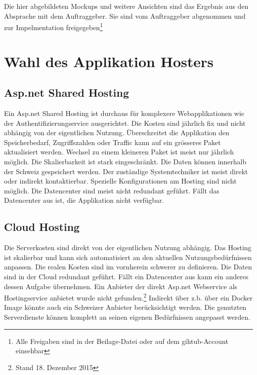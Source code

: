 Die hier abgebildeten Mockups und weitere Ansichten sind das Ergebnis
aus den Absprache mit dem Auftraggeber. Sie sind vom Auftraggeber
abgenommen und zur Impelmentation freigegeben\footnote{Alle Freigaben
  sind in der Beilage-Datei oder auf dem gihtub-Account einsehbar
  \newpage}

\section{Wahl des Applikation
Hosters}\label{wahl-des-applikation-hosters}

\subsection{Asp.net Shared Hosting}\label{asp.net-shared-hosting}

Ein Asp.net Shared Hosting ist durchaus für komplexere Webapplikationen
wie der Authentifizierungservice ausgerichtet. Die Kosten sind jährlich
fix und nicht abhängig von der eigentlichen Nutzung. Überschreitet die
Applikation den Speicherbedarf, Zugriffszahlen oder Traffic kann auf ein
grösseres Paket aktualisiert werden. Wechsel zu einem kleineren Paket
ist meist nur jährlich möglich. Die Skalierbarkeit ist stark
eingeschränkt. Die Daten können innerhalb der Schweiz gespeichert
werden. Der zuständige Systemtechniker ist meist direkt oder indirekt
kontaktierbar. Spezielle Konfigurationen am Hosting sind nicht möglich.
Die Datencenter sind meist nicht redundant geführt. Fällt das
Datencenter aus ist, die Applikation nicht verfügbar.

\subsection{Cloud Hosting}\label{cloud-hosting}

Die Serverkosten sind direkt von der eigentlichen Nutzung abhängig. Das
Hosting ist skalierbar und kann sich automatisiert an den aktuellen
Nutzungsbedürfnissen anpassen. Die realen Kosten sind im vornherein
schwerer zu definieren. Die Daten sind in der Cloud redundant geführt.
Fällt ein Datencenter aus kann ein anderes dessen Aufgabe übernehmen.
Ein Anbieter der direkt Asp.net Webservice als Hostingservice anbietet
wurde nicht gefunden.\footnote{Stand 18. Dezember 2015} Indirekt über
z.b. über ein Docker Image könnte auch ein Schweizer Anbieter
berücksichtigt werden. Die genutzten Serverdienste können komplett an
seinen eigenen Bedürfnissen angepasst werden.

